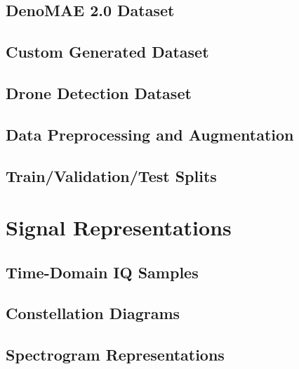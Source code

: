\subsection{DenoMAE 2.0 Dataset}

\subsection{Custom Generated Dataset}

\subsection{Drone Detection Dataset}

\subsection{Data Preprocessing and Augmentation}

\subsection{Train/Validation/Test Splits}

\section{Signal Representations}

\subsection{Time-Domain IQ Samples}

\subsection{Constellation Diagrams}

\subsection{Spectrogram Representations}

